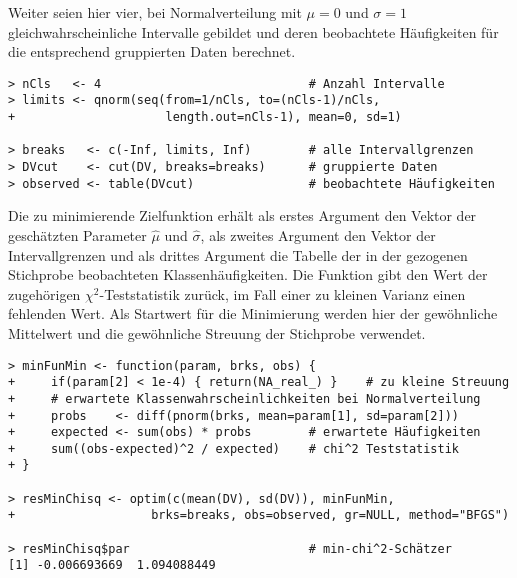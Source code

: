 Weiter seien hier vier, bei Normalverteilung mit $\mu = 0$ und $\sigma = 1$ gleichwahrscheinliche Intervalle gebildet und deren beobachtete Häufigkeiten für die entsprechend gruppierten Daten berechnet.
\begin{lstlisting}
> nCls   <- 4                             # Anzahl Intervalle
> limits <- qnorm(seq(from=1/nCls, to=(nCls-1)/nCls,
+                     length.out=nCls-1), mean=0, sd=1)

> breaks   <- c(-Inf, limits, Inf)        # alle Intervallgrenzen
> DVcut    <- cut(DV, breaks=breaks)      # gruppierte Daten
> observed <- table(DVcut)                # beobachtete Häufigkeiten
\end{lstlisting}

Die zu minimierende Zielfunktion erhält als erstes Argument den Vektor der geschätzten Parameter $\hat{\mu}$ und $\hat{\sigma}$, als zweites Argument den Vektor der Intervallgrenzen und als drittes Argument die Tabelle der in der gezogenen Stichprobe beobachteten Klassenhäufigkeiten. Die Funktion gibt den Wert der zugehörigen $\chi^{2}$-Teststatistik zurück, im Fall einer zu kleinen Varianz einen fehlenden Wert. Als Startwert für die Minimierung werden hier der gewöhnliche Mittelwert und die gewöhnliche Streuung der Stichprobe verwendet.
\begin{lstlisting}
> minFunMin <- function(param, brks, obs) {
+     if(param[2] < 1e-4) { return(NA_real_) }    # zu kleine Streuung
+     # erwartete Klassenwahrscheinlichkeiten bei Normalverteilung
+     probs    <- diff(pnorm(brks, mean=param[1], sd=param[2]))
+     expected <- sum(obs) * probs        # erwartete Häufigkeiten
+     sum((obs-expected)^2 / expected)    # chi^2 Teststatistik
+ }

> resMinChisq <- optim(c(mean(DV), sd(DV)), minFunMin,
+                   brks=breaks, obs=observed, gr=NULL, method="BFGS")

> resMinChisq$par                         # min-chi^2-Schätzer
[1] -0.006693669  1.094088449
\end{lstlisting}

